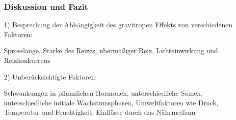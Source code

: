 \documentclass[aspectratio=169]{beamer}
\begin{document}
	\begin{frame}
		\frametitle{Diskussion und Fazit}
		
	1) Besprechung der Abhängigkeit des gravitropen Effekts von verschiedenen Faktoren:
	
	Sprosslänge, Stärke des Reizes, übermäßiger Reiz, Lichteinwirkung und Reizkonkurrenz
	
	2) Unberücksichtigte Faktoren:
	
	Schwankungen in pflanzlichen Hormonen, unterschiedliche Samen, unterschiedliche initiale Wachstumsphasen, Umweltfaktoren wie Druck, Temperatur und Feuchtigkeit, Einflüsse durch das Nährmedium
	
 
		
		
\end{frame}	
	
\end{document}
